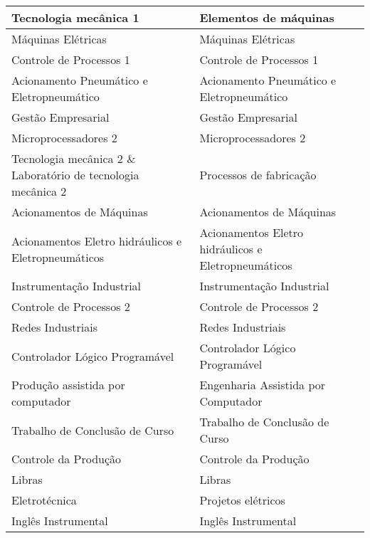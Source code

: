 \begin{quadro}[!h]
{\begin{tabular}{| m{5cm} | m{5cm}|}
\hline
Tecnologia mecânica 1 & Elementos de máquinas\\
\hline
Máquinas Elétricas & Máquinas Elétricas\\
\hline
Controle de Processos 1 & Controle de Processos 1\\
\hline
Acionamento Pneumático e Eletropneumático & Acionamento Pneumático e Eletropneumático\\
\hline
Gestão Empresarial & Gestão Empresarial\\
\hline
Microprocessadores 2 & Microprocessadores 2\\
\hline
Tecnologia mecânica 2 \& Laboratório de tecnologia mecânica 2 & Processos de fabricação\\
\hline
Acionamentos de Máquinas & Acionamentos de Máquinas\\
\hline
Acionamentos Eletro hidráulicos e Eletropneumáticos & Acionamentos Eletro hidráulicos e Eletropneumáticos\\
\hline
Instrumentação Industrial & Instrumentação Industrial\\
\hline
Controle de Processos 2 & Controle de Processos 2\\
\hline
Redes Industriais & Redes Industriais\\
\hline
Controlador Lógico Programável & Controlador Lógico Programável\\
\hline
Produção assistida por computador & Engenharia Assistida por Computador\\
\hline
Trabalho de Conclusão de Curso & Trabalho de Conclusão de Curso\\
\hline
Controle da Produção & Controle da Produção\\
\hline
Libras & Libras\\
\hline
Eletrotécnica & Projetos elétricos\\
\hline
Inglês Instrumental & Inglês Instrumental\\
\hline

\end{tabular}
}{
}
\end{quadro}

